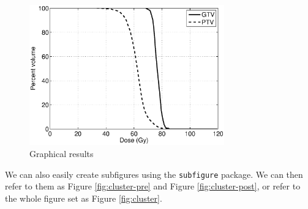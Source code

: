 \documentclass[12pt]{article}
\begin{document}
\begin{figure}[tbp]
	\centering 
	\includegraphics[width=0.75\textwidth]{graph}
	\caption{Graphical results} 
	\label{fig:DVHs}
\end{figure}

We can also easily create subfigures using the \texttt{subfigure} package. We can then refer to them as Figure \ref{fig:cluster-pre} and Figure \ref{fig:cluster-post}, or refer to the whole figure set as Figure \ref{fig:cluster}.
\end{document}
